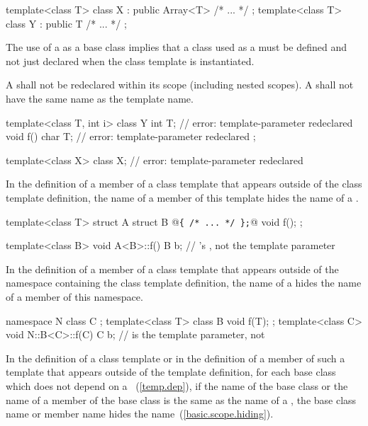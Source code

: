 \begin{codeblock}
template<class T> class X : public Array<T> { /* ... */ };
template<class T> class Y : public T { /* ... */ };
\end{codeblock}

The use of a  as a base class implies that
a class used as a  must be defined and
not just declared when the class template is instantiated.
\exitnote

\pnum
A
shall not be redeclared within its scope (including nested scopes).
A
shall not have the same name as the template name.
\enterexample

\begin{codeblock}
template<class T, int i> class Y {
	int T;			// error: template-parameter redeclared
	void f() {
		char T;		// error: template-parameter redeclared
	}
};

template<class X> class X;	// error: template-parameter redeclared
\end{codeblock}
\exitexampleb

\pnum
In the definition of a member of
a class template that appears outside of the class template definition,
the name of a member of this template hides the name of a
.
\enterexample

\begin{codeblock}
template<class T> struct A {
	struct B @\texttt{\{ /* ... */ \};}@
	void f();
};

template<class B> void A<B>::f() {
	B b;			// 's , not the template parameter
}
\end{codeblock}
\exitexampleb

\pnum
In the definition of a member of a class template that appears outside of the
namespace containing the class template definition,
the name of a
hides the name of a member of this namespace.
\enterexample

\begin{codeblock}
namespace N {
	class C { };
	template<class T> class B {
		void f(T);
	};
}
template<class C> void N::B<C>::f(C) {
	C b;			//  is the template parameter, not 
}
\end{codeblock}
\exitexampleb

\pnum
In the definition of a class template or in the definition of a member of such
a template that appears outside of the template definition,
for each base class which does not depend on a
~(\ref{temp.dep}), if the name of the base class
or the name of a member of the
base class is the same as the name of a
,
the base class name or member name hides the
name~(\ref{basic.scope.hiding}).
\enterexample

